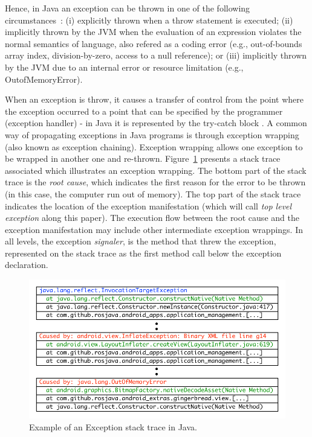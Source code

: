 \documentclass[conference]{IEEEtran}
\begin{document}
Hence, in Java an exception can be thrown in one of the following
circumstances~\cite{gosling2000java}: 
(i) explicitly thrown when a throw statement is executed; 
(ii) implicitly thrown by the JVM when the evaluation of an expression
 violates the normal semantics of language, also refered as a coding error
 (e.g., out-of-bounds array index, division-by-zero, access to a null reference); or 
(iii) implicitly thrown by the JVM due to an internal error or resource limitation (e.g.,
OutofMemoryError). 


When an exception is throw, it causes a transfer of control from the point
where the exception occurred to a point that can be specified by the programmer
(exception handler) - in Java it is represented by the try-catch block . A common way of  
propagating exceptions in Java programs is through exception wrapping
 (also known as exception chaining). Exception wrapping allows one exception to be wrapped in another one and re-thrown. 
Figure~\ref{fig:wrapping} presents a stack trace associated which illustrates an
exception wrapping. The bottom part of the stack trace is the \emph{root cause}, which indicates the
first reason for the error to be thrown (in this case, the computer run out of
memory). The top part of the stack trace indicates the location of the exception
manifestation (which will call \emph{top level exception} along this paper). The
execution flow  between the root cause and the exception manifestation may
include other intermediate exception wrappings. In all levels, the exception
\emph{signaler}, is the method that threw the exception, represented on the
stack trace as the first method call below the exception declaration.

\begin{figure} \centering \includegraphics[scale=0.6]{wrappings}
\caption{Example of an Exception stack trace in Java.}
\label{fig:wrapping}
\end{figure}
\end{document}
